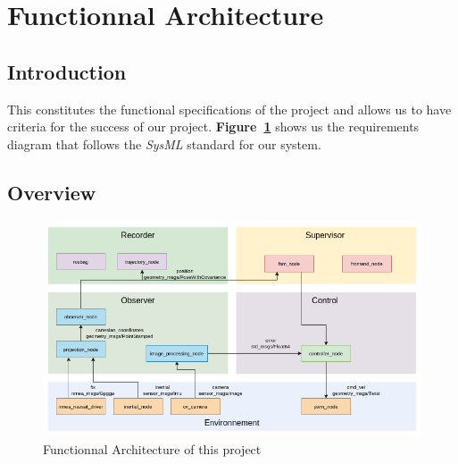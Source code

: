 \section{Functionnal Architecture}

\subsection{Introduction}
This constitutes the functional specifications of the project and allows us to have criteria
for the success of our project. \textbf{Figure~\ref{fig:requirement}} shows us the requirements
diagram that follows the \textit{SysML} standard for our system.

\subsection{Overview} %

\begin{figure}[!ht]
    \begin{center}
        \includegraphics[scale=0.51]{Images/node_graph.png}
    \end{center}
    \caption{Functionnal Architecture of this project}
    \label{fig:requirement}
\end{figure}

\newpage